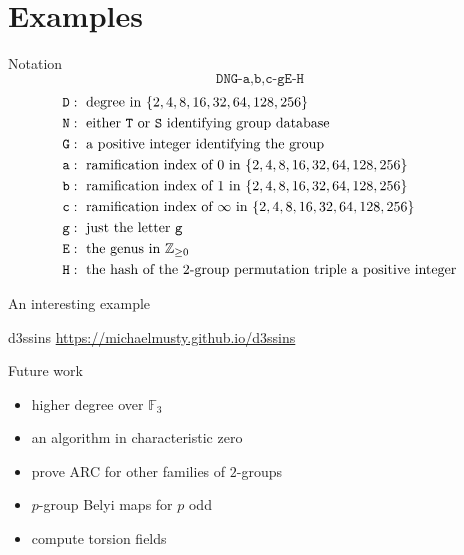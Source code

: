 \documentclass[xcolor=dvipsnames]{beamer}
\theoremstyle{plain}
\newcommand{\ZZ}{\mathbb Z}
\newcommand{\FF}{\mathbb{F}}
\begin{document}
  \section{Examples}{
    \begin{frame}{Notation}
      \begin{equation*}
        \texttt{DNG-a,b,c-gE-H}
      \end{equation*}
      \begin{align*}
        \texttt{D} &:\text{ degree in }
        \{2,4,8,16,32,64,128,256\}\\
        \texttt{N} &:\text{ either \texttt{T}
        or \texttt{S} identifying group
        database}\\
        \texttt{G} &:\text{ a positive integer
        identifying the group}\\
        \texttt{a} &:\text{ ramification index
        of $0$ in }
        \{2,4,8,16,32,64,128,256\}\\
        \texttt{b} &:\text{ ramification index
        of $1$ in }
        \{2,4,8,16,32,64,128,256\}\\
        \texttt{c} &:\text{ ramification index
        of $\infty$ in }
        \{2,4,8,16,32,64,128,256\}\\
        \texttt{g} &:\text{ just the letter 
        \texttt{g}}\\
        \texttt{E} &:\text{ the genus in }
        \ZZ_{\geq 0}\\
        \texttt{H} &:\text{ the hash
        of the $2$-group permutation triple 
        a positive integer}
      \end{align*}
    \end{frame}
    \begin{frame}{An interesting example}
    \end{frame}
    \begin{frame}{d3ssins}
        \url{https://michaelmusty.github.io/d3ssins}
    \end{frame}
  }
  \begin{frame}{Future work}
    \begin{itemize}
      \item
        higher degree over $\FF_3$
      \item
        an algorithm in characteristic zero
      \item
        prove ARC for other families of $2$-groups
      \item
        $p$-group Belyi maps for $p$ odd
      \item
        compute torsion fields
    \end{itemize}
  \end{frame}
\end{document}

